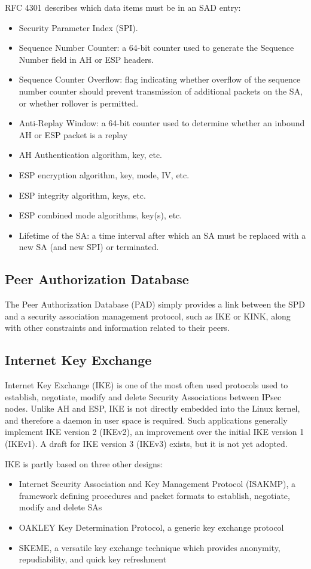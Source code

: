\documentclass[a4paper,12pt]{report}
\begin{document}
	RFC 4301 describes which data items must be in an SAD entry:
	\begin{itemize}
		\item Security Parameter Index (SPI).
		\item Sequence Number Counter: a 64-bit counter used to generate the Sequence Number field in AH or ESP headers.
		\item Sequence Counter Overflow: flag indicating whether overflow of the sequence number counter should prevent transmission of additional packets on the SA, or whether rollover is permitted.
		\item Anti-Replay Window: a 64-bit counter used to determine whether an inbound AH or ESP packet is a replay
		\item AH Authentication algorithm, key, etc.
		\item ESP encryption algorithm, key, mode, IV, etc.
		\item ESP integrity algorithm, keys, etc.
		\item ESP combined mode algorithms, key(s), etc.
		\item Lifetime of the SA: a time interval after which an SA must be replaced with a new SA (and new SPI) or terminated.
	\end{itemize}
	
	\subsection{Peer Authorization Database}
	The Peer Authorization Database (PAD) simply provides a link between the SPD and a security association management protocol, such as IKE or KINK, along with other constraints and information related to their peers.
	
	
	\subsection{Internet Key Exchange}
		Internet Key Exchange (IKE) is one of the most often used protocols used to establish, negotiate, modify and delete Security Associations between IPsec nodes. Unlike AH and ESP, IKE is not directly embedded into the Linux kernel, and therefore a daemon in user space is required. Such applications generally implement IKE version 2 (IKEv2), an improvement over the initial IKE version 1 (IKEv1). A draft for IKE version 3 (IKEv3) exists, but it is not yet adopted.
		
		IKE is partly based on three other designs:
		\begin{itemize}
			\item Internet Security Association and Key Management Protocol (ISAKMP), a framework defining procedures and packet formats to establish, negotiate, modify and delete SAs
			\item OAKLEY Key Determination Protocol, a generic key exchange protocol
			\item SKEME, a versatile key exchange technique which provides anonymity, repudiability, and quick key refreshment
		\end{itemize}
		
\end{document}
